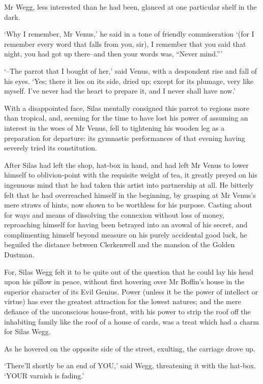 Mr Wegg, less interested than he had been, glanced at one particular
shelf in the dark.

‘Why I remember, Mr Venus,’ he said in a tone of friendly commiseration
‘(for I remember every word that falls from you, sir), I remember that
you said that night, you had got up there--and then your words was,
“Never mind.”’

‘--The parrot that I bought of her,’ said Venus, with a despondent rise
and fall of his eyes. ‘Yes; there it lies on its side, dried up; except
for its plumage, very like myself. I’ve never had the heart to prepare
it, and I never shall have now.’

With a disappointed face, Silas mentally consigned this parrot to
regions more than tropical, and, seeming for the time to have lost
his power of assuming an interest in the woes of Mr Venus, fell to
tightening his wooden leg as a preparation for departure: its gymnastic
performances of that evening having severely tried its constitution.

After Silas had left the shop, hat-box in hand, and had left Mr Venus
to lower himself to oblivion-point with the requisite weight of tea, it
greatly preyed on his ingenuous mind that he had taken this artist into
partnership at all. He bitterly felt that he had overreached himself in
the beginning, by grasping at Mr Venus’s mere straws of hints, now shown
to be worthless for his purpose. Casting about for ways and means of
dissolving the connexion without loss of money, reproaching himself for
having been betrayed into an avowal of his secret, and complimenting
himself beyond measure on his purely accidental good luck, he beguiled
the distance between Clerkenwell and the mansion of the Golden Dustman.

For, Silas Wegg felt it to be quite out of the question that he could
lay his head upon his pillow in peace, without first hovering over
Mr Boffin’s house in the superior character of its Evil Genius. Power
(unless it be the power of intellect or virtue) has ever the greatest
attraction for the lowest natures; and the mere defiance of the
unconscious house-front, with his power to strip the roof off the
inhabiting family like the roof of a house of cards, was a treat which
had a charm for Silas Wegg.

As he hovered on the opposite side of the street, exulting, the carriage
drove up.

‘There’ll shortly be an end of YOU,’ said Wegg, threatening it with the
hat-box. ‘YOUR varnish is fading.’

